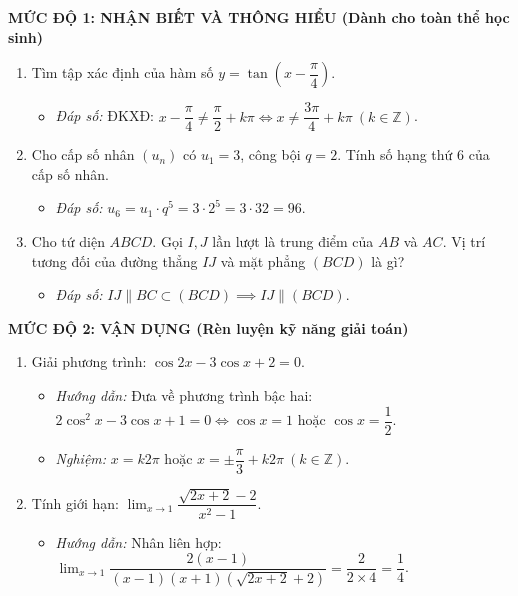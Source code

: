 \documentclass[12pt, a4paper]{article}
\begin{document}
\noindent \textbf{MỨC ĐỘ 1: NHẬN BIẾT VÀ THÔNG HIỂU (Dành cho toàn thể học sinh)}
\begin{enumerate}
    \item Tìm tập xác định của hàm số $y = \tan\left(x - \dfrac{\pi}{4}\right)$.
    \begin{itemize}
        \item \textit{Đáp số:} ĐKXĐ: $x - \dfrac{\pi}{4} \neq \dfrac{\pi}{2} + k\pi \iff x \neq \dfrac{3\pi}{4} + k\pi \ (k \in \mathbb{Z})$.
    \end{itemize}
    \item Cho cấp số nhân $(u_n)$ có $u_1 = 3$, công bội $q = 2$. Tính số hạng thứ 6 của cấp số nhân.
    \begin{itemize}
        \item \textit{Đáp số:} $u_6 = u_1 \cdot q^5 = 3 \cdot 2^5 = 3 \cdot 32 = 96$.
    \end{itemize}
    \item Cho tứ diện $ABCD$. Gọi $I, J$ lần lượt là trung điểm của $AB$ và $AC$. Vị trí tương đối của đường thẳng $IJ$ và mặt phẳng $(BCD)$ là gì?
    \begin{itemize}
        \item \textit{Đáp số:} $IJ \parallel BC \subset (BCD) \implies IJ \parallel (BCD)$.
    \end{itemize}
\end{enumerate}

\noindent \textbf{MỨC ĐỘ 2: VẬN DỤNG (Rèn luyện kỹ năng giải toán)}
\begin{enumerate}
    \item Giải phương trình: $\cos 2x - 3\cos x + 2 = 0$.
    \begin{itemize}
        \item \textit{Hướng dẫn:} Đưa về phương trình bậc hai: $2\cos^2 x - 3\cos x + 1 = 0 \iff \cos x = 1$ hoặc $\cos x = \dfrac{1}{2}$.
        \item \textit{Nghiệm:} $x = k2\pi$ hoặc $x = \pm \dfrac{\pi}{3} + k2\pi \ (k \in \mathbb{Z})$.
    \end{itemize}
    \item Tính giới hạn: $\lim_{x \to 1} \dfrac{\sqrt{2x+2} - 2}{x^2 - 1}$.
    \begin{itemize}
        \item \textit{Hướng dẫn:} Nhân liên hợp: $\lim_{x \to 1} \dfrac{2(x-1)}{(x-1)(x+1)(\sqrt{2x+2}+2)} = \dfrac{2}{2 \times 4} = \dfrac{1}{4}$.
    \end{itemize}
\end{enumerate}
\end{document}
